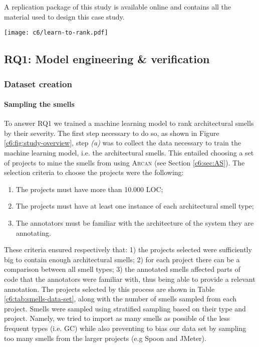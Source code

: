 A replication package of this study is available online\cite{ReplicationPackageC6} and contains all the material used to design this case study.

\begin{figure*}
    \centering
    \texttt{[image: c6/learn-to-rank.pdf]}
    \caption{Detailed diagram of the model engineering and model evaluation phases.}\label{c6:fig:study-overview}
\end{figure*}

\subsection{RQ1: Model engineering \& verification}\label{c6:sec:rq1-methodology}
\subsubsection{Dataset creation}
\paragraph{Sampling the smells}
To answer RQ1 we trained a machine learning model to rank architectural smells by their severity.
The first step necessary to do so, as shown in Figure \ref{c6:fig:study-overview}, step \emph{(a)} was to collect the data necessary to train the machine learning model, i.e. the architectural smells. This entailed choosing a set of projects to mine the smells from using \textsc{Arcan} (see Section \ref{c6:sec:AS}). 
The selection criteria to choose the projects were the following:
\begin{enumerate}
    \item The projects must have more than 10.000 LOC; 
    \item The projects must have at least one instance of each architectural smell type;
    \item The annotators must be familiar with the architecture of the system they are annotating.
\end{enumerate}
These criteria ensured respectively that: 1) the projects selected were sufficiently big to contain enough architectural smells; 2) for each project there can be a comparison between all smell types; 3) the annotated smells affected parts of code that the annotators were familiar with, thus being able to provide a relevant annotation.
The projects selected by this process are shown in Table \ref{c6:tab:smells-data-set}, along with the number of smells sampled from each project.
Smells were sampled using stratified sampling based on their type and project.
Namely, we tried to import as many smells as possible of the less frequent types (i.e. GC) while also preventing to bias our data set by sampling too many smells from the larger projects (e.g Spoon and JMeter).

